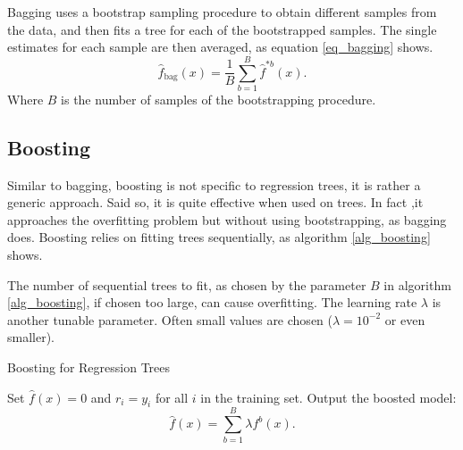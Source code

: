 \documentclass[a4paper,11pt]{article}
\begin{document}
Bagging uses a bootstrap sampling procedure to obtain different samples from the data, and then fits a tree for each of the bootstrapped samples. The single estimates for each sample are then averaged, as equation \ref{eq_bagging} shows. 
\begin{equation}
  \label{eq_bagging}
  \hat{f}_{\text{bag}}(x) = \frac{1}{B} \sum_{b=1}^{B} \hat{f}^{*b}(x).
\end{equation}
Where $B$ is the number of samples of the bootstrapping procedure.

\subsection{Boosting}

Similar to bagging, boosting is not specific to regression trees, it is rather a generic approach. Said so, it is quite effective when used on trees. In fact ,it approaches the overfitting problem but without using bootstrapping, as bagging does. Boosting relies on fitting trees sequentially, as algorithm \ref{alg_boosting} shows. 

The number of sequential trees to fit, as chosen by the parameter $B$ in algorithm  \ref{alg_boosting}, if chosen too large, can cause overfitting. The learning rate $\lambda$ is another tunable parameter. Often small values are chosen ($\lambda=10^{-2}$ or even smaller).

\begin{algorithm}
  \caption{Boosting for Regression Trees}
  \label{alg_boosting}
  \SetAlgoLined
  \DontPrintSemicolon
  
  Set $\hat{f}(x) = 0$ and $r_i = y_i$ for all $i$ in the training set.\;
  Output the boosted model:
  \begin{equation}
  \hat{f}(x) = \sum_{b=1}^B \lambda f^b(x).
  \end{equation}\;
  
\end{algorithm}
  


\newpage

\printbibliography
\end{document}
